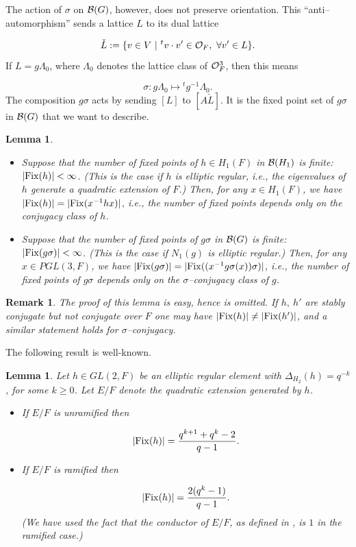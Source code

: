 \documentclass[12pt,letterpaper]{article}
\newtheorem{lemma}[theorem]{Lemma}
\newtheorem{remark}{Remark}
\def\off{{\cal O}_F}
\def\bbg{{\cal B}(G)}
\def\bbH1{{\cal B}(H_1)}
\begin{document}
The action of $\sigma$ on $\bbg$, however, does not preserve orientation.
This ``anti--automorphism'' sends a lattice $L$ to its dual lattice

\begin{equation}
\label{eqn:4.3}
\check{L} :=\{v \in V\ |\ {^{t}v}\cdot v' \in \off , \ \forall v' \in L\}.
\end{equation}
If $L=g\Lambda_0$, where $\Lambda_0$ denotes the lattice class of
$\off^3$, then this means

\[
\sigma : g\Lambda_0 \longmapsto {^{t}g^{-1}}\Lambda_0.
\]
The composition $g\sigma$ acts by sending $[L]$ to $[A\check{L}]$. It is the
fixed point set of $g\sigma$ in $\bbg$ that we want to describe.

\begin{lemma}
\label{lemma:4.4} 
\begin{itemize}

\item[(a)] 
Suppose that the number of fixed points of 
$h\in H_1(F)$ in $\bbH1$ is finite: $|{\rm Fix}(h)| < \infty$. 
(This is the case if
$h$ is elliptic regular, i.e., the eigenvalues of $h$ generate a quadratic
extension of $F$.) Then, for any $x\in H_1(F)$, we have 
$|{\rm Fix}(h)| =|{\rm Fix}(x^{-1}hx)|$,
i.e., the number of fixed points depends only on the conjugacy class of $h$.

\item[(b)] 
Suppose that the number of fixed points of $g\sigma$ in $\bbg$ is
finite: $|{\rm Fix}(g\sigma )|<\infty$. (This is the case if $N_1(g)$ is 
elliptic regular.) Then, for any $x\in PGL(3,F)$, we have 
$|{\rm Fix}(g\sigma )| = |{\rm Fix}((x^{-1}g\sigma (x))\sigma )|$,
i.e., the number of fixed points of $g\sigma$ depends only on the
$\sigma$--conjugacy class of $g$.
\end{itemize}
\end{lemma}

\begin{remark}
The proof of this lemma is easy, hence is omitted. 
If $h,\ h'$ are stably conjugate but not conjugate over $F$ one
may have $|{\rm Fix}(h)|\not= |{\rm Fix}(h')|$, 
and a similar statement holds for
$\sigma$--conjugacy.
\end{remark}
 
The following result is well-known. 

\begin{lemma}
\label{lemma:4.5} 
Let $h\in GL(2,F)$ be an elliptic regular element
with $\Delta_{H_2} (h)=q^{-k}$, for some $k\geq 0$. Let $E/F$ denote the
quadratic extension generated by $h$. 

\begin{itemize}
\item 
If $E/F$ is unramified then

\[
|{\rm Fix}(h)|={{q^{k+1}+q^k-2}\over{q-1}}.
\]        
\item 
If $E/F$ is ramified then

\[
|{\rm Fix}(h)|={2(q^k-1)\over{q-1}}.
\]        
(We have used the fact that the conductor of $E/F$, as defined in \cite{Bl},
is $1$ in the ramified case.)
\end{itemize}
\end{lemma}
\end{document}
